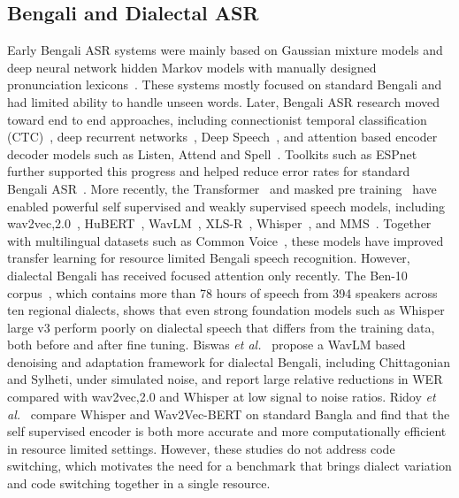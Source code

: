 \documentclass[journal]{IEEEtran}
\begin{document}
\subsection{Bengali and Dialectal ASR}
Early Bengali ASR systems were mainly based on Gaussian mixture models and deep neural network hidden Markov models with manually designed pronunciation lexicons~\cite{hasnat2007isolated,swarna2017survey}. These systems mostly focused on standard Bengali and had limited ability to handle unseen words. Later, Bengali ASR research moved toward end to end approaches, including connectionist temporal classification (CTC)~\cite{graves2006ctc}, deep recurrent networks~\cite{graves2013speech}, Deep Speech~\cite{hannun2014deep}, and attention based encoder decoder models such as Listen, Attend and Spell~\cite{chan2016listen}. Toolkits such as ESPnet~\cite{watanabe2018espnet} further supported this progress and helped reduce error rates for standard Bengali ASR~\cite{mandal2020e2e}. More recently, the Transformer~\cite{vaswani2017attention} and masked pre training~\cite{devlin2019bert} have enabled powerful self supervised and weakly supervised speech models, including wav2vec,2.0~\cite{baevski2020wav2vec2}, HuBERT~\cite{hsu2021hubert}, WavLM~\cite{chen2022wavlm}, XLS-R~\cite{babu2022xlsr,conneau2021xlsr}, Whisper~\cite{radford2023whisper}, and MMS~\cite{pratap2024mms}. Together with multilingual datasets such as Common Voice~\cite{ardila2020commonvoice}, these models have improved transfer learning for resource limited Bengali speech recognition. However, dialectal Bengali has received focused attention only recently. The Ben-10 corpus~\cite{ben10_2025}, which contains more than 78 hours of speech from 394 speakers across ten regional dialects, shows that even strong foundation models such as Whisper large v3 perform poorly on dialectal speech that differs from the training data, both before and after fine tuning. Biswas \emph{et al.}~\cite{biswas2025unified} propose a WavLM based denoising and adaptation framework for dialectal Bengali, including Chittagonian and Sylheti, under simulated noise, and report large relative reductions in WER compared with wav2vec,2.0 and Whisper at low signal to noise ratios. Ridoy \emph{et al.}~\cite{ridoy2025adaptability} compare Whisper and Wav2Vec-BERT on standard Bangla and find that the self supervised encoder is both more accurate and more computationally efficient in resource limited settings. However, these studies do not address code switching, which motivates the need for a benchmark that brings dialect variation and code switching together in a single resource.
\end{document}
